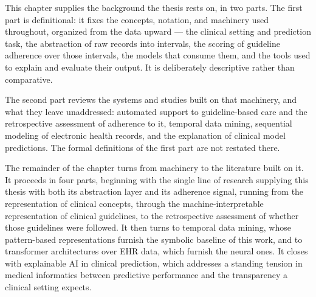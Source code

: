 This chapter supplies the background the thesis rests on, in two parts. The
first part is definitional: it fixes the concepts, notation, and machinery used
throughout, organized from the data upward --- the clinical setting and
prediction task, the abstraction of raw records into intervals, the scoring of
guideline adherence over those intervals, the models that consume them, and the
tools used to explain and evaluate their output. It is deliberately descriptive
rather than comparative.

The second part reviews the systems and studies built on that machinery, and
what they leave unaddressed: automated support to guideline-based care and the
retrospective assessment of adherence to it, temporal data mining, sequential
modeling of electronic health records, and the explanation of clinical model
predictions. The formal definitions of the first part are not restated there.



\clearpage
The remainder of the chapter turns from machinery to the literature built on
it. It proceeds in four parts, beginning with the single line of research
supplying this thesis with both its abstraction layer and its adherence signal,
running from the representation of clinical concepts, through the
machine-interpretable representation of clinical guidelines, to the
retrospective assessment of whether those guidelines were followed. It then
turns to temporal data mining, whose pattern-based representations furnish the
symbolic baseline of this work, and to transformer architectures over EHR data,
which furnish the neural ones. It closes with explainable AI in clinical
prediction, which addresses a standing tension in medical informatics between
predictive performance and the transparency a clinical setting expects.


